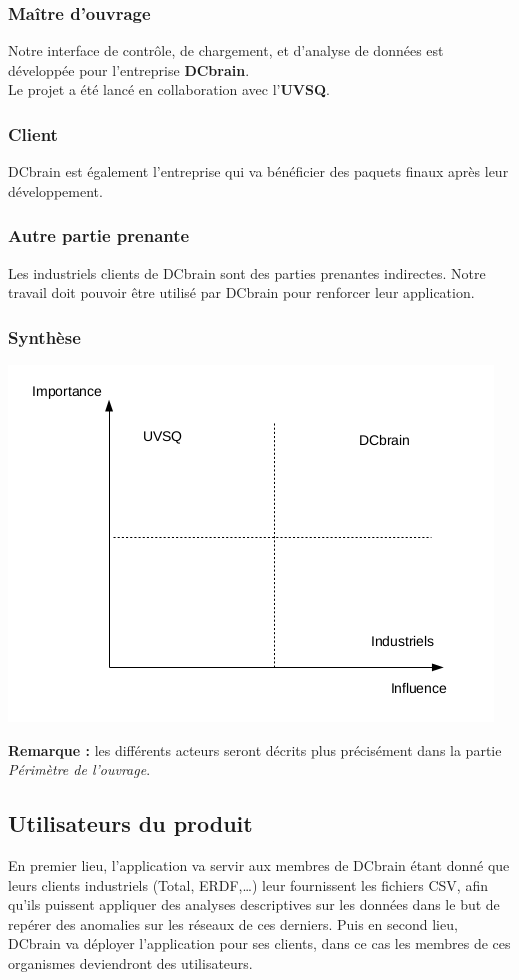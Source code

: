 			\subsubsection{Maître d'ouvrage}
			Notre interface de contrôle, de chargement, et d'analyse de données est développée pour l'entreprise \textbf{DCbrain}.\\
			Le projet a été lancé en collaboration avec l'\textbf{UVSQ}.
			
			\subsubsection{Client}
			DCbrain est également l'entreprise qui va bénéficier des paquets finaux après leur développement.
			
			\subsubsection{Autre partie prenante}
			Les industriels clients de DCbrain sont des parties prenantes indirectes. Notre travail doit pouvoir être utilisé par DCbrain pour renforcer leur application.
			
			\subsubsection{Synthèse}
			\begin{center}\includegraphics[scale=0.8]{diagPP.png}\end{center}
			\textbf{Remarque :} les différents acteurs seront décrits plus précisément dans la partie \textit{Périmètre de l'ouvrage}.
			
		\subsection{Utilisateurs du produit}
		En premier lieu, l’application va servir aux membres de DCbrain étant donné que leurs clients industriels (Total, ERDF,…) leur fournissent les fichiers CSV, afin qu’ils puissent appliquer des analyses descriptives sur les données dans le but de repérer des anomalies sur les réseaux de ces derniers. Puis en second lieu, DCbrain va déployer l'application pour ses clients, dans ce cas les membres de ces organismes deviendront des utilisateurs.\\


